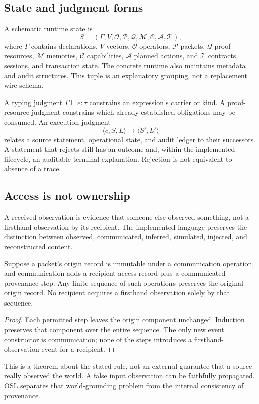 \documentclass[11pt]{article}
\begin{document}
\subsection{State and judgment forms}
A schematic runtime state is
\[
 S=(\Gamma,V,\mathcal O,\mathcal P,\mathcal Q,\mathcal M,\mathcal C,\mathcal A,\mathcal T),
\]
where \(\Gamma\) contains declarations, \(V\) vectors, \(\mathcal O\) operators, \(\mathcal P\) packets, \(\mathcal Q\) proof resources, \(\mathcal M\) memories, \(\mathcal C\) capabilities, \(\mathcal A\) planned actions, and \(\mathcal T\) contracts, sessions, and transaction state. The concrete runtime also maintains metadata and audit structures. This tuple is an explanatory grouping, not a replacement wire schema.

A typing judgment \(\Gamma\vdash e:\tau\) constrains an expression's carrier or kind. A proof-resource judgment constrains which already established obligations may be consumed. An execution judgment
\[
 \langle c,S,L\rangle\longrightarrow\langle S',L'\rangle
\]
relates a source statement, operational state, and audit ledger to their successors. A statement that rejects still has an outcome and, within the implemented lifecycle, an auditable terminal explanation. Rejection is not equivalent to absence of a trace.

\subsection{Access is not ownership}
A received observation is evidence that someone else observed something, not a firsthand observation by its recipient. The implemented language preserves the distinction between observed, communicated, inferred, simulated, injected, and reconstructed content. \cite{o03,o05}

\begin{proposition}
Suppose a packet's origin record is immutable under a communication operation, and communication adds a recipient access record plus a communicated provenance step. Any finite sequence of such operations preserves the original origin record. No recipient acquires a firsthand observation solely by that sequence.
\end{proposition}
\begin{proof}
Each permitted step leaves the origin component unchanged. Induction preserves that component over the entire sequence. The only new event constructor is communication; none of the steps introduces a firsthand-observation event for a recipient.
\end{proof}
This is a theorem about the stated rule, not an external guarantee that a source really observed the world. A false input observation can be faithfully propagated. OSL separates that world-grounding problem from the internal consistency of provenance.
\end{document}
